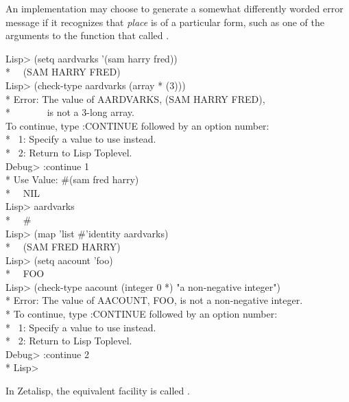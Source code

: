 \begin{defmac}
  \beforenoterule
  \begin{implementation}
  An implementation may choose to generate a somewhat
  differently worded error message if it recognizes that {\it place} is of a
  particular form, such as one of the arguments to the function that called
  .
  \end{implementation}
\afternoterule

\begin{lisp}
Lisp> (setq aardvarks '(sam harry fred)) \\*
~\EV\ (SAM HARRY FRED) \\
Lisp> (check-type aardvarks (array * (3))) \\*
Error: The value of AARDVARKS, (SAM HARRY FRED), \\*
~~~~~~~is not a 3-long array. \\
To continue, type :CONTINUE followed by an option number: \\*
~1: Specify a value to use instead. \\*
~2: Return to Lisp Toplevel. \\
Debug> :continue 1 \\*
Use Value: \#(sam fred harry) \\*
~\EV\ NIL \\
Lisp> aardvarks \\*
~\EV\ \#<ARRAY-3 13571> \\
Lisp> (map 'list \#'identity aardvarks) \\*
~\EV\ (SAM FRED HARRY) \\
Lisp> (setq aacount 'foo) \\*
~\EV\ FOO \\
Lisp> (check-type aacount (integer 0 *) "a non-negative integer") \\*
Error: The value of AACOUNT, FOO, is not a non-negative integer. \\*
To continue, type :CONTINUE followed by an option number: \\*
~1: Specify a value to use instead. \\*
~2: Return to Lisp Toplevel. \\
Debug> :continue 2 \\*
Lisp> 
\end{lisp}

\beforenoterule
  \begin{incompatibility}
  In Zetalisp, the equivalent facility is called .
  \end{incompatibility}
\afternoterule
\end{defmac}


